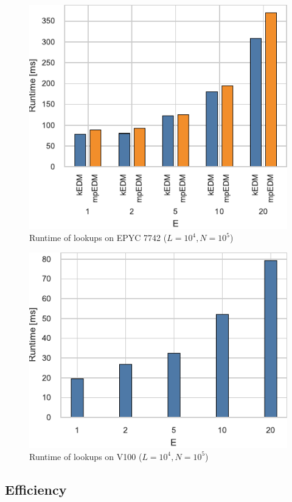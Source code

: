 \documentclass[conference]{IEEEtran}
\begin{document}
\begin{figure}
    \centering
    \includegraphics{figs/runtime_lookup_epyc}
    \caption{Runtime of lookups on EPYC 7742 ($L=10^4, N=10^5$)}%
    \label{fig:breakdown-lookup-epyc}
\end{figure}

\begin{figure}
    \centering
    \includegraphics{figs/runtime_lookup_v100}
    \caption{Runtime of lookups on V100 ($L=10^4, N=10^5$)}%
    \label{fig:breakdown-lookup-v100}
\end{figure}

\subsection{Efficiency}
\end{document}
